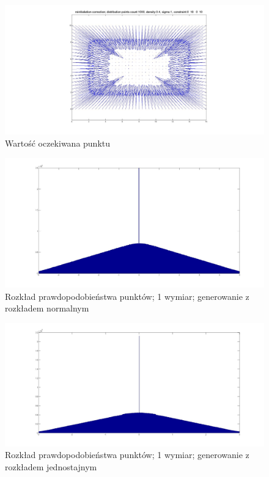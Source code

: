 \documentclass{mini}
\begin{document}
\begin{figure}[H]
\centering
\includegraphics[width=\textwidth]{reinitialization2dprzesuniecie}
\caption{Wartość oczekiwana punktu}
\end{figure}

\begin{figure}[H]
\centering
\includegraphics[width=\textwidth]{ri_n_20M_1__5_5}
\caption{Rozkład prawdopodobieństwa punktów; 1 wymiar; generowanie z rozkładem normalnym}
\end{figure}

\begin{figure}[H]
\centering
\includegraphics[width=\textwidth]{ri_j_20M_1__3_3}
\caption{Rozkład prawdopodobieństwa punktów; 1 wymiar; generowanie z rozkładem jednostajnym}
\end{figure}
\end{document}

